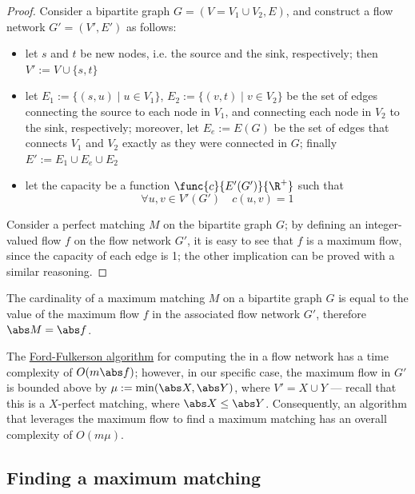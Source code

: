 \documentclass[a4paper, 12pt]{report}
\begin{document}
    \begin{proof}
        Consider a bipartite graph $G = (V = V_1 \cup V_2, E)$, and construct a flow network $G' = (V', E')$ as follows:

        \begin{itemize}
            \item let $s$ and $t$ be new nodes, i.e. the source and the sink, respectively; then $V' := V \cup \{s, t\}$
            \item let $E_1 := \{(s, u) \mid u \in V_1\}$, $E_2 := \{(v, t) \mid v \in V_2\}$ be the set of edges connecting the source to each node in $V_1$, and connecting each node in $V_2$ to the sink, respectively; moreover, let $E_e := E(G)$ be the set of edges that connects $V_1$ and $V_2$ exactly as they were connected in $G$; finally $E' := E_1 \cup E_e \cup E_2$
            \item let the capacity be a function $\func{c}{E'(G')}{\R^+}$ such that $$\forall u, v \in V'(G') \quad c(u, v) = 1$$
        \end{itemize}

        Consider a perfect matching $M$ on the bipartite graph $G$; by defining an integer-valued flow $f$ on the flow network $G'$, it is easy to see that $f$ is a maximum flow, since the capacity of each edge is 1; the other implication can be proved with a similar reasoning.

         
    \end{proof}

    \begin{framedcor}{}
        The cardinality of a maximum matching $M$ on a bipartite graph $G$ is equal to the value of the maximum flow $f$ in the associated flow network $G'$, therefore $\abs M = \abs f$.
    \end{framedcor}

    The \href{https://en.wikipedia.org/wiki/Ford%E2%80%93Fulkerson_algorithm}{Ford-Fulkerson algorithm} for computing the \tit{maximum flow} in a flow network has a time complexity of $O(m \abs f)$; however, in our specific case, the maximum flow in $G'$ is bounded above by $\mu := \min(\abs X, \abs Y)$, where $V' = X \cup Y$ --- recall that this is a $X$-perfect matching, where $\abs X \le \abs Y$. Consequently, an algorithm that leverages the maximum flow to find a maximum matching has an overall complexity of $O(m \mu)$.

    \subsection{Finding a maximum matching}
\end{document}
